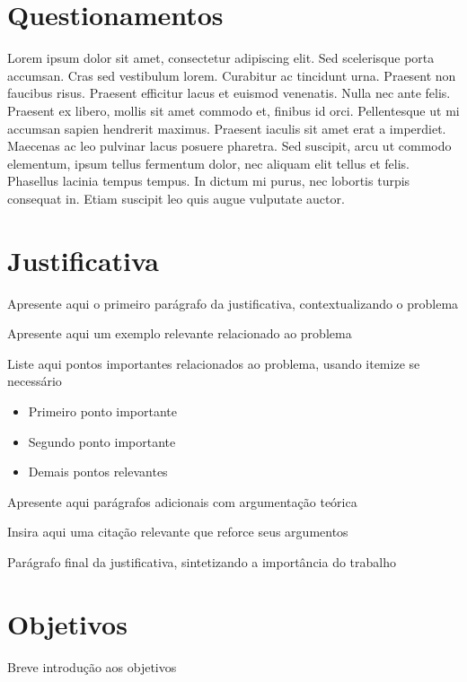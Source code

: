 \section{Questionamentos}
\label{1-questao}

Lorem ipsum dolor sit amet, consectetur adipiscing elit. Sed scelerisque porta accumsan. Cras sed vestibulum lorem. Curabitur ac tincidunt urna. Praesent non faucibus risus. Praesent efficitur lacus et euismod venenatis. Nulla nec ante felis. Praesent ex libero, mollis sit amet commodo et, finibus id orci. Pellentesque ut mi accumsan sapien hendrerit maximus. Praesent iaculis sit amet erat a imperdiet. Maecenas ac leo pulvinar lacus posuere pharetra. Sed suscipit, arcu ut commodo elementum, ipsum tellus fermentum dolor, nec aliquam elit tellus et felis. Phasellus lacinia tempus tempus. In dictum mi purus, nec lobortis turpis consequat in. Etiam suscipit leo quis augue vulputate auctor.

\section{Justificativa}
\label{1-justificativa}
Apresente aqui o primeiro parágrafo da justificativa, contextualizando o problema

Apresente aqui um exemplo relevante relacionado ao problema

Liste aqui pontos importantes relacionados ao problema, usando itemize se necessário
\begin{itemize}
	\item Primeiro ponto importante
	\item Segundo ponto importante
	\item Demais pontos relevantes
\end{itemize}

Apresente aqui parágrafos adicionais com argumentação teórica

\begin{citacao}
	Insira aqui uma citação relevante que reforce seus argumentos \cite{arruda2007}
\end{citacao}

Parágrafo final da justificativa, sintetizando a importância do trabalho

\section{Objetivos}
\label{1-objetivos}

Breve introdução aos objetivos

